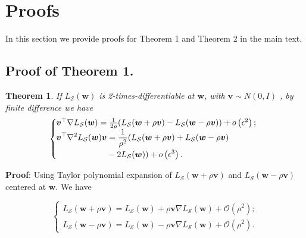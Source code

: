 \documentclass[letterpaper]{article} %
\theoremstyle{plain}
\newtheorem{theorem}{Theorem}
\theoremstyle{definition}
\begin{document}


\newpage

\section{Proofs}
In this section we provide proofs for Theorem 1 and Theorem 2 in the main text.

\subsection{Proof of Theorem 1.}
\begin{theorem} \label{theorem:fd}
If $L_{\mathcal{S}}(\boldsymbol{w})$ is 2-times-differentiable at $\boldsymbol{w}$, with $\boldsymbol{v} \sim N(0, I)$ , by finite difference we have
\begin{equation*}
\left\{\begin{array}{l}
\hspace{-0.2cm}\boldsymbol{v}^{\top} \nabla L_{\mathcal{S}}(\boldsymbol{w}) =\frac{1}{2\rho} (L_{\mathcal{S}}(\boldsymbol{w} + \rho\boldsymbol{v})- L_{\mathcal{S}}(\boldsymbol{w} - \rho\boldsymbol{v}))+o\left(\epsilon^2\right) ; \\

\begin{aligned}
\hspace{-0.2cm}\boldsymbol{v}^{\top} \nabla^2 L_{\mathcal{S}}(\boldsymbol{w}) \boldsymbol{v} &= \frac{1}{\rho^2} (L_{\mathcal{S}}(\boldsymbol{w}+\rho\boldsymbol{v})+L_{\mathcal{S}}(\boldsymbol{w}-\rho\boldsymbol{v}) \\
&-2 L_{\mathcal{S}}(\boldsymbol{w}))+o\left(\epsilon^3\right).
\end{aligned}
\end{array}\right.
\end{equation*}
\end{theorem}

\textbf{Proof}: Using Taylor polynomial expansion of $L_{\mathcal{S}}(\boldsymbol{w}+\rho\boldsymbol{v})$ and $L_{\mathcal{S}}(\boldsymbol{w}-\rho\boldsymbol{v})$ centered at $\boldsymbol{w}$. We have 


\begin{equation}
\left\{\begin{array}{l}
L_{\mathcal{S}}(\boldsymbol{w}+\rho\boldsymbol{v})=L_{\mathcal{S}}(\boldsymbol{w}) + \rho\boldsymbol{v}\nabla L_{\mathcal{S}}(\boldsymbol{w})+\mathcal{O}\left(\rho^2\right) ; \\[10pt]
L_{\mathcal{S}}(\boldsymbol{w}-\rho\boldsymbol{v})=L_{\mathcal{S}}(\boldsymbol{w}) - \rho\boldsymbol{v}\nabla L_{\mathcal{S}}(\boldsymbol{w})+\mathcal{O}\left(\rho^2\right) .
\end{array}\right.
\end{equation}
\end{document}
